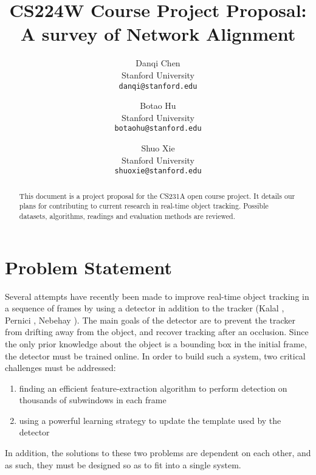 \documentclass[11pt,letterpaper]{article}
\begin{document}
\title{CS224W Course Project Proposal: A survey of Network Alignment}

\author{Danqi Chen\\
Stanford University\\
{\tt\small danqi@stanford.edu}
\and
Botao Hu\\
Stanford University\\
{\tt\small botaohu@stanford.edu}
%
\and
Shuo Xie\\
Stanford University\\
{\tt\small shuoxie@stanford.edu}
}

\maketitle
\thispagestyle{empty}

\maketitle

\begin{abstract}
   This document is a project proposal for the CS231A open course project. It details our plans for contributing to current research in real-time object tracking. Possible datasets, algorithms, readings  and evaluation methods are reviewed.
\end{abstract}

\section{Problem Statement}

Several attempts have recently been made to improve real-time object tracking in a sequence of frames by using a detector in addition to the tracker (Kalal  \cite{kalal2012tracking}, Pernici  \cite{pernicifacehugger}, Nebehay  \cite{nebehay2011evaluation}). The main goals of the detector are to prevent the tracker from drifting away from the object, and recover tracking after an occlusion. Since the only prior knowledge about the object is a bounding box in the initial frame, the detector must be trained online. In order to build such a system, two critical challenges must be addressed:
\begin{enumerate}
\item
finding an efficient feature-extraction algorithm to perform detection on thousands of subwindows in each frame
\item
using a powerful learning strategy to update the template used by the detector
\end{enumerate}
In addition, the solutions to these two problems are dependent on each other, and as such, they must be designed so as to fit into a single system.
\end{document}
